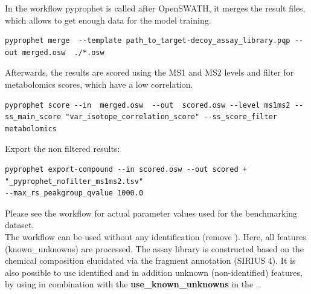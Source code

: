 \noindent In the workflow pyprophet is called after OpenSWATH, it merges the result files, which allows to get enough data for the model training. 

\begin{listing}
\begin{verbatim}
pyprophet merge  --template path_to_target-decoy_assay_library.pqp --out merged.osw  ./*.osw
\end{verbatim}
\end{listing}

\noindent Afterwards, the results are scored using the MS1 and MS2 levels and filter for metabolomics scores, which have a low correlation. 

\begin{listing}
\begin{verbatim}
pyprophet score --in  merged.osw  --out  scored.osw --level ms1ms2 --ss_main_score "var_isotope_correlation_score" --ss_score_filter metabolomics
\end{verbatim}
\end{listing}
\noindent Export the non filtered results: 

\begin{listing}
\begin{verbatim}
pyprophet export-compound --in scored.osw --out scored + "_pyprophet_nofilter_ms1ms2.tsv" 
--max_rs_peakgroup_qvalue 1000.0
\end{verbatim}
\end{listing}
\noindent Please see the workflow for actual parameter values used for the benchmarking dataset. \\

\noindent  The workflow can be used without any identification (remove ). Here, all features (known\_unknowns) are processed. The assay library is constructed based on the chemical composition elucidated via the fragment annotation (SIRIUS 4). It is also possible to use identified and in addition unknown (non-identified) features, by using  in combination with the \textbf{use\_known\_unknowns} in the .  
